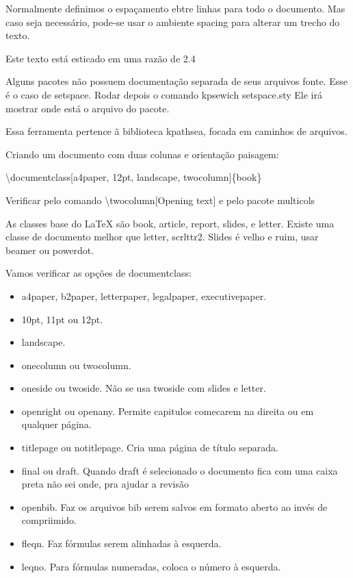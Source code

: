 \documentclass{a4paper, 12pts}{book}
\begin{document}
Normalmente definimos o espaçamento ebtre linhas para todo o documento.
Mas caso seja necessário, pode-se usar o ambiente spacing para alterar um trecho do texto.

\begin{spacing}{2.4}
    Este texto está esticado em uma razão de 2.4
\end{spacing}

Alguns pacotes não possuem documentação separada de seus arquivos fonte.
Esse é o caso de setspace.
Rodar depois o comando kpsewich setspace.sty
Ele irá mostrar onde está o arquivo do pacote.

Essa ferramenta pertence ã biblioteca kpathsea, focada em caminhos de arquivos.

Criando um documento com duas colunas e orientação paisagem:

\backslash documentclass[a4paper, 12pt, landscape, twocolumn]\{book\}

Verificar pelo comando \backslash twocolumn[Opening text]
e pelo pacote multicols

As classes base do LaTeX são book, article, report, slides, e letter.
Existe uma classe de documento melhor que letter, scrlttr2. Slides é velho e ruim, usar beamer ou powerdot.


Vamos verificar as opções de documentclass:
\begin{itemize}
    \item a4paper, b2paper, letterpaper, legalpaper, executivepaper.
    \item 10pt, 11pt ou 12pt. 
    \item landscape.
    \item onecolumn ou twocolumn.
    \item oneside ou twoside. Não se usa twoside com slides e letter.
    \item openright ou openany. Permite capitulos comecarem na direita ou em qualquer página.
    \item titlepage ou notitlepage. Cria uma página de título separada.
    \item final ou draft. Quando draft é selecionado o documento fica com uma caixa preta não sei onde, pra ajudar a revisão
    \item openbib. Faz os arquivos bib serem salvos em formato aberto ao invés de compriimido.
    \item fleqn. Faz fórmulas serem alinhadas à esquerda.
    \item leqno. Para fórmulas numeradas, coloca o número à esquerda.
\end{itemize}
\end{document}
